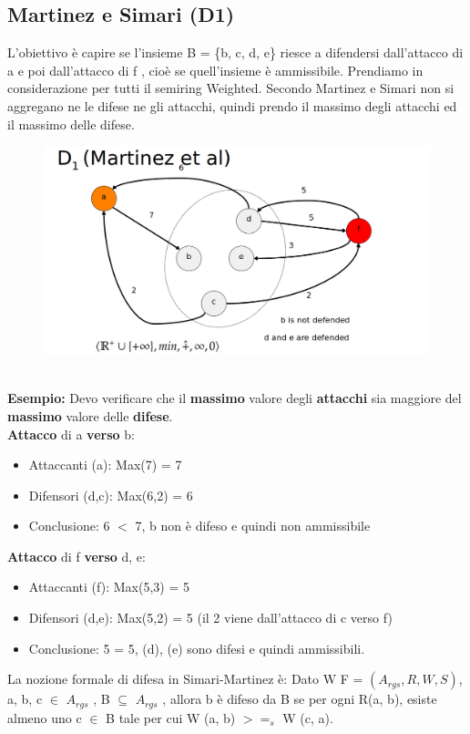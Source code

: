     \subsection{Martinez e Simari (D1)}
    L'obiettivo è capire se l'insieme B = \{b, c, d, e\} riesce a difendersi
    dall'attacco di a e poi dall'attacco di f , cioè se quell'insieme è
    ammissibile. Prendiamo in considerazione per tutti il semiring Weighted.
    Secondo Martinez e Simari non si aggregano ne le difese ne gli attacchi,
    quindi prendo il massimo degli attacchi ed il massimo delle difese.
    \begin{figure}[htp]
        \centering
        \includegraphics[width=13cm, keepaspectratio]{img/Cap6/martinez2.png}

    \end{figure}
    \\\textbf{Esempio:} Devo verificare che il \textbf{massimo} valore degli
    \textbf{attacchi} sia maggiore del \textbf{massimo} valore delle
    \textbf{difese}. \\\textbf{Attacco} di a \textbf{verso} b:
    \begin{itemize}
        \item Attaccanti (a): Max(7) = 7
        \item Difensori (d,c): Max(6,2) = 6
        \item Conclusione: 6 $<$ 7, b non è difeso e quindi non ammissibile
    \end{itemize}
    \textbf{Attacco} di f \textbf{verso} d, e:
    \begin{itemize}
        \item  Attaccanti (f): Max(5,3) = 5
        \item Difensori (d,e): Max(5,2) = 5 (il 2 viene dall'attacco di c verso
              f)
        \item Conclusione: 5 = 5, (d), (e) sono difesi e quindi ammissibili.
    \end{itemize}
    La nozione formale di difesa in Simari-Martinez è: Dato W F = $(A_{rgs} , R,
W, S)$, a, b, c $\in$ $A_{rgs}$ , B $\subseteq$ $A_{rgs}$ , allora b è
    difeso da B se per ogni R(a, b), esiste almeno uno c $\in$ B tale per cui W
    (a, b) $>=_s$ W (c, a).


